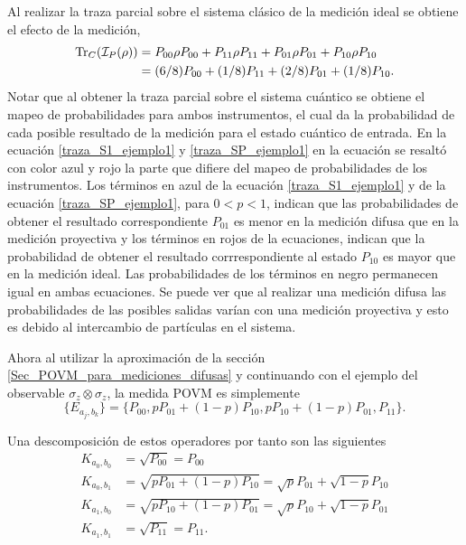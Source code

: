 Al realizar la traza parcial sobre el sistema clásico de la medición ideal se obtiene el efecto de la medición,\begin{equation}\label{traza_AP_ejemploP}\begin{split}
       {\rm Tr}_C(\mathcal{I}_P(\rho)) &= P_{00} \rho P_{00} + P_{11}\rho P_{11}+ P_{01}\rho P_{01}+P_{10}\rho P_{10}\\
      &=(6/8)P_{00} + (1/8)P_{11}+(2/8) P_{01}+ (1/8)P_{10}.\\
 \end{split}
\end{equation}
Notar que al obtener la traza parcial sobre el sistema cuántico se obtiene el mapeo de probabilidades para ambos instrumentos, el cual da la probabilidad de cada posible resultado de la medición para el estado cuántico de entrada. En la ecuación {\ref{traza_S1_ejemplo1}}  y {\ref{traza_SP_ejemplo1}} en la ecuación se resaltó con color azul y rojo la parte que difiere del mapeo de probabilidades de los instrumentos. Los términos en azul de la ecuación {\ref{traza_S1_ejemplo1}} y de la ecuación {\ref{traza_SP_ejemplo1}}, para $0<p<1$, indican que las probabilidades de obtener el resultado correspondiente $P_{01}$ es menor en la medición difusa que en la medición proyectiva y los términos en rojos de la ecuaciones, indican que la probabilidad de obtener el resultado corrrespondiente al estado $P_{10}$ es mayor que en la medición ideal. Las probabilidades de los términos en negro permanecen igual en ambas ecuaciones.  Se puede ver que al realizar una medición difusa las probabilidades de las posibles salidas varían con una medición proyectiva y esto es debido al intercambio de partículas en el sistema. 



Ahora al utilizar la aproximación de la sección {\ref{Sec_POVM_para_mediciones_difusas}} y continuando con el ejemplo del observable $\sigma_z \otimes \sigma_z$, la medida POVM es simplemente \[\{E_{a_j, b_k}\}= \{P_{00},p P_{01}+(1-p)P_{10},p P_{10}+(1-p)P_{01},P_{11}\}.\] 

Una   descomposición de estos operadores por tanto son las siguientes
\begin{equation}
    \begin{split}
        K_{a_0,b_0}&=\sqrt{P_{00}}=P_{00}\\
        K_{a_0,b_1}&=\sqrt{p P_{01}+(1-p)P_{10}}=\sqrt{p}P_{01}+\sqrt{1-p}P_{10}\\
        K_{a_1,b_0}&=\sqrt{p P_{10}+(1-p)P_{01}}=\sqrt{p}P_{10}+\sqrt{1-p}P_{01}\\
        K_{a_1,b_1}&=\sqrt{P_{11}}=P_{11}.\\
\end{split}
\end{equation} 


